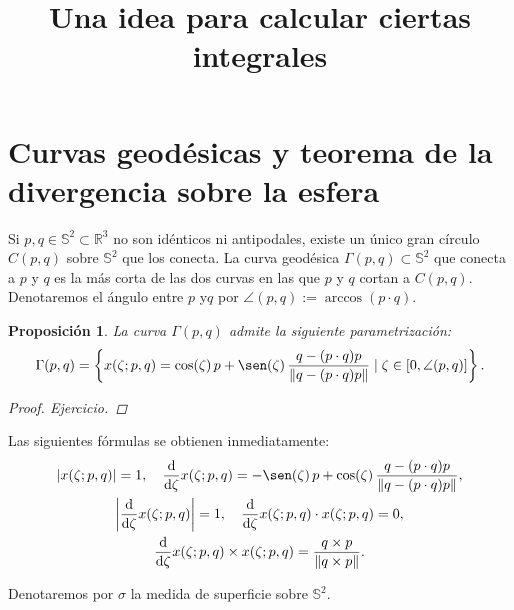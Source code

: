 \documentclass[reqno]{amsart}
\newcommand{\norm}[2][y]{\if#1y\left\fi\lVert#2\if#1y\right\fi\rVert} %
\newcommand{\abs}[2][y]{\if#1y\left\fi\lvert#2\if#1y\right\fi\rvert} %
\newtheorem{proposition}[thm]{Proposición}
\begin{document}
\title{Una idea para calcular ciertas integrales}
\maketitle

\section{Curvas geodésicas y teorema de la divergencia sobre la esfera}

Si $p, q \in \mathbb{S}^2 \subset \mathbb{R}^3$ no son idénticos ni antipodales, existe un único gran círculo $C(p,q)$ sobre $\mathbb{S}^2$ que los conecta.
La curva geodésica $\Gamma(p,q) \subset \mathbb{S}^2$ que conecta a $p$ y $q$ es la más corta de las dos curvas en las que $p$ y $q$ cortan a $C(p,q)$.
Denotaremos el ángulo entre $p$ y$ q$ por $\angle(p,q) := \arccos(p\cdot q)$.

\begin{proposition}\label{pro:param} La curva $\Gamma(p,q)$ admite la siguiente parametrización:
%
\begin{equation*}
\Gamma(p,q) = \left\{ x(\zeta;p,q) = \cos(\zeta) \, p + \sen(\zeta) \, \frac{q - (p\cdot q)p}{\norm{q - (p\cdot q)p}} \mid \zeta \in [0, \angle(p,q)] \right\}.
\end{equation*}
%
\begin{proof} Ejercicio.
\end{proof}
\end{proposition}
%
Las siguientes fórmulas se obtienen inmediatamente:
%
\begin{equation}\label{param-aux}
\begin{gathered}
\abs{x(\zeta;p,q)} = 1, \quad
\frac{\mathrm{d}}{\mathrm{d}\zeta} x(\zeta;p,q) = -\sen(\zeta) \, p + \cos(\zeta) \, \frac{q - (p\cdot q)p}{\norm{q - (p\cdot q)p}},\\
\abs{\frac{\mathrm{d}}{\mathrm{d}\zeta} x(\zeta;p,q)} = 1, \quad
\frac{\mathrm{d}}{\mathrm{d}\zeta} x(\zeta;p,q) \cdot x(\zeta;p,q) = 0,\\
\frac{\mathrm{d}}{\mathrm{d}\zeta} x(\zeta;p,q) \times x(\zeta;p,q) = \frac{q \times p}{\norm{q \times p}}.
\end{gathered}
\end{equation}

Denotaremos por $\sigma$ la medida de superficie sobre $\mathbb{S}^2$.
\end{document}

